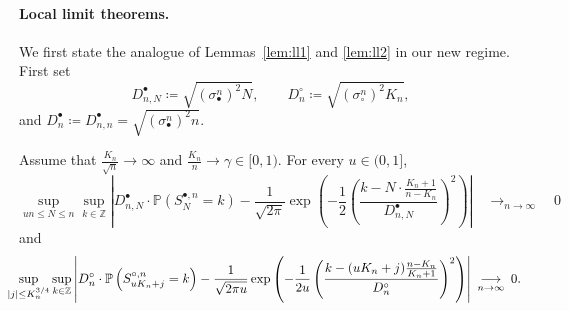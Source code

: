 \documentclass[AHL,XML,longabstracts,Unicode]{cedram}
\newcommand{\Z}{\mathbb{Z}}
\def\scn{\sigma_{\circ}^{n}}
\def\sbn{\sigma_{\bullet}^{n}}
\def\Sbn{S^{\bullet,n}}
\def\Scn{S^{\circ,n}}
\def\DbnN{D^{\bullet}_{n,N}}
\def\Dbn{D^{\bullet}_{n}}
\def\Dcn{D^{\circ}_{n}}
\renewcommand\Pr[1]{\mathbb{P}\left(#1\right)}
\begin{document}
\paragraph*{Local limit theorems.} We first state the analogue of Lemmas~\ref{lem:ll1} and \ref{lem:ll2} in our new regime.
First set
\[\DbnN \coloneqq \sqrt{ (\sbn)^{2}  N}, \qquad \Dcn \coloneqq\sqrt{ (\scn)^{2} K_{n} },\]
and $\Dbn \coloneqq D^{\bullet}_{n,n}= \sqrt{ (\sbn)^{2}  n}$.

\begin{lemma}
\label{lem:locallimitbis}
Assume that $\tfrac{K_{n}}{\sqrt{n}} \rightarrow  \infty$ and $\tfrac{K_{n}}{n}   \rightarrow  \gamma \in [0,1)$.
For every $u \in (0,1]$,
\begin{equation}
\label{eq:ext1}\sup_{un \leq N \leq n} \sup_{k \in \Z  } \left|  \DbnN  \cdot \Pr{\Sbn_N=k}
  -    \frac{1}{\sqrt{2 \pi}}\exp \left(-   \frac{1}{2}\left( \frac{k-  N \cdot  \frac{K_{n}+1}{n-K_{n}}}
  {  \DbnN  } \right)^{2}\right)\right|  \quad \mathop{\longrightarrow}_{n \rightarrow \infty} \quad 0
\end{equation}
and
\begin{equation}
  \label{eq:ext2} \hspace{-3.5mm} \sup_{|j| \leq K_{n}^{3/4}} \sup_{k \in \Z} \left|  \Dcn \cdot \Pr{\Scn_{ uK_{n}  + j }=k} -  \frac{1}{\sqrt{2 \pi u}} \exp \left(  - \frac{1}{2u} \left( \frac{k- (uK_{n}+j) \frac{n-K_{n}}{K_{n}+1}}{\Dcn} \right)^{2} \right)\right|  \ \mathop{\longrightarrow}_{n \rightarrow \infty} \ 0.
\end{equation}
\end{lemma}
\end{document}
